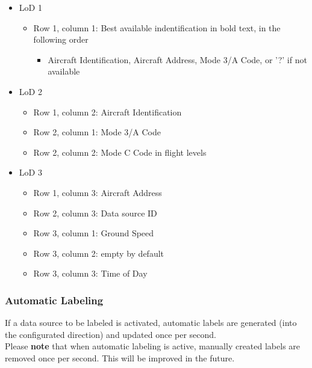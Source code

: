 \begin{itemize}
\item LoD 1
\begin{itemize}
 \item Row 1, column 1: Best available indentification in bold text, in the following order
 \begin{itemize}
 \item Aircraft Identification, Aircraft Address, Mode 3/A Code, or '?' if not available
 \end{itemize} 
 \end{itemize} 
\item LoD 2 
 \begin{itemize}
 \item Row 1, column 2: Aircraft Identification
 \item Row 2, column 1: Mode 3/A Code
 \item Row 2, column 2: Mode C Code in flight levels
 \end{itemize} 
\item LoD 3
 \begin{itemize}
 \item Row 1, column 3: Aircraft Address
 \item Row 2, column 3: Data source ID
 \item Row 3, column 1: Ground Speed
 \item Row 3, column 2: empty by default
 \item Row 3, column 3: Time of Day
 \end{itemize} 
\end{itemize} 


\subsubsection{Automatic Labeling}

If a data source to be labeled is activated, automatic labels are generated (into the configurated direction) and updated once per second. \\

Please \textbf{note} that when automatic labeling is active, manually created labels are removed once per second. This will be improved in the future.

